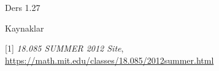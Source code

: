 \documentclass[12pt,fleqn]{article}\usepackage{../../common}
\begin{document}
Ders 1.27








Kaynaklar

[1] {\em 18.085 SUMMER 2012 Site},
    \url{https://math.mit.edu/classes/18.085/2012summer.html}
\end{document}
